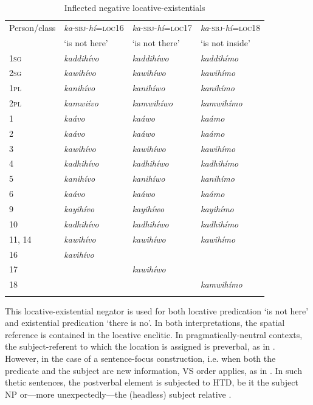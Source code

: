 \documentclass[output=paper,colorlinks=true, citecolor=brown,draftmode]{langscibook}
\begin{document}
\begin{table}
\begin{tabularx}{\textwidth}{lXXX}
\lsptoprule
Person/class & \textit{ka}-\textsc{sbj}-\textit{hí}=\textsc{loc16} & \textit{ka}-\textsc{sbj}-\textit{hí}=\textsc{loc17} & \textit{ka}-\textsc{sbj}-\textit{hí}=\textsc{loc18} \\
 & ‘is not here’ & ‘is not there’ & ‘is not inside’ \\
\midrule 
\scshape 1sg & \textit{kaddihívo} & \textit{kaddihíwo} & \textit{kaddihímo}  \\
\scshape 2sg & \textit{kawihívo} & \textit{kawihíwo} & \textit{kawihímo} \\
\scshape 1pl  & \textit{kanihívo} & \textit{kanihíwo} & \textit{kanihímo} \\
\scshape 2pl  & \textit{kamwiívo} & \textit{kamwihíwo} & \textit{kamwihímo} \\
1 & \textit{kaávo} & \textit{kaáwo} & \textit{kaámo} \\
2 & \textit{kaávo} & \textit{kaáwo} & \textit{kaámo} \\
3 & \textit{kawihívo} & \textit{kawihíwo} & \textit{kawihímo} \\
4 & \textit{kadhihívo} & \textit{kadhihíwo} & \textit{kadhihímo} \\
5 & \textit{kanihívo} & \textit{kanihíwo} & \textit{kanihímo} \\
6 & \textit{kaávo} & \textit{kaáwo} & \textit{kaámo} \\
9 & \textit{kayihívo} & \textit{kayihíwo} & \textit{kayihímo} \\
10 & \textit{kadhihívo} & \textit{kadhihíwo} & \textit{kadhihímo} \\
11, 14 & \textit{kawihívo} & \textit{kawihíwo} & \textit{kawihímo} \\ 
16 & \textit{kavihívo} &  &  \\
17 &  & \textit{kawihíwo} &  \\
18 &  &  & \textit{kamwihímo} \\
\lspbottomrule
\end{tabularx}
\caption{Inflected negative locative-existentials}
\label{tab:cuw:4}
\end{table}

This locative-existential negator is used for both locative predication ‘is not here’ and existential predication ‘there is no’. In both interpretations, the spatial reference is contained in the locative enclitic. In pragmatically-neutral contexts, the subject-referent to which the location is assigned is preverbal, as in . However, in the case of a sentence-focus construction, i.e. when both the predicate and the subject are new information, VS order applies, as in . In such thetic sentences, the postverbal element is subjected to HTD, be it the subject NP  or---more unexpectedly---the (headless) subject relative . 
\end{document}
